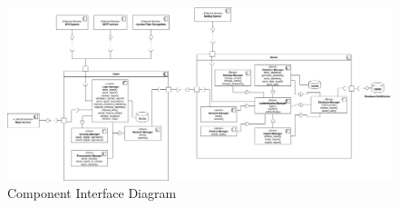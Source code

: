 \documentclass{article}
\begin{document}
\begin{figure}[H]
    \centering
    \includegraphics[width=1.2\textwidth, left]{img/component_interface_diagrams/component_interface.png}
    \caption{Component Interface Diagram}
\end{figure}
\subsection{}
\end{document}
